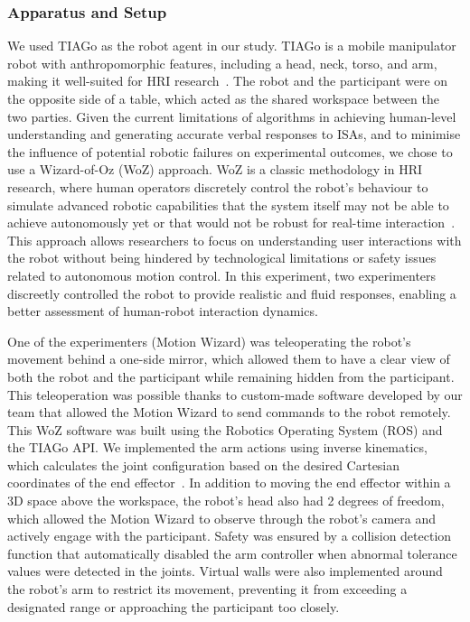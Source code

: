 \subsubsection{Apparatus and Setup}
We used TIAGo as the robot agent in our study. TIAGo is a mobile manipulator robot with anthropomorphic features, including a head, neck, torso, and arm, making it well-suited for HRI research~\cite{pages2016tiago}. The robot and the participant were on the opposite side of a table, which acted as the shared workspace between the two parties. Given the current limitations of algorithms in achieving human-level understanding and generating accurate verbal responses to ISAs, and to minimise the influence of potential robotic failures on experimental outcomes, we chose to use a Wizard-of-Oz (WoZ) approach. WoZ is a classic methodology in HRI research, where human operators discretely control the robot’s behaviour to simulate advanced robotic capabilities that the system itself may not be able to achieve autonomously yet or that would not be robust for real-time interaction~\cite{martelaro2016wizard}. This approach allows researchers to focus on understanding user interactions with the robot without being hindered by technological limitations or safety issues related to autonomous motion control. 
In this experiment, two experimenters discreetly controlled the robot to provide realistic and fluid responses, enabling a better assessment of human-robot interaction dynamics.

One of the experimenters (Motion Wizard) was teleoperating the robot's movement behind a one-side mirror, which allowed them to have a clear view of both the robot and the participant while remaining hidden from the participant.
This teleoperation was possible thanks to custom-made software developed by our team that allowed the Motion Wizard to send commands to the robot remotely. This WoZ software was built using the Robotics Operating System (ROS) and the TIAGo API. We implemented the arm actions using inverse kinematics, which calculates the joint configuration based on the desired Cartesian coordinates of the end effector~\cite{chitta2017}. In addition to moving the end effector within a 3D space above the workspace, the robot's head also had 2 degrees of freedom, which allowed the Motion Wizard to observe through the robot's camera and actively engage with the participant. Safety was ensured by a collision detection function that automatically disabled the arm controller when abnormal tolerance values were detected in the joints. Virtual walls were also implemented around the robot's arm to restrict its movement, preventing it from exceeding a designated range or approaching the participant too closely.

